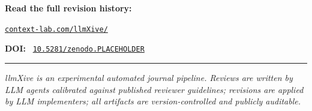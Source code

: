 \documentclass[11pt]{article}
\begin{document}
\noindent\textbf{\sffamily Read the full revision history:}\par
\noindent\href{https://context-lab.com/llmXive/}{\texttt{context-lab.com/llmXive/}}\par
\vspace{0.5em}

\noindent\textbf{\sffamily DOI:}~%
\href{https://doi.org/10.5281/zenodo.PLACEHOLDER}{\texttt{10.5281/zenodo.PLACEHOLDER}}
\vfill

\noindent\textcolor{badgeMuted}{\rule{\textwidth}{0.4pt}}\par
\vspace{0.3em}
\noindent\small\textcolor{badgeMuted}{%
\textit{llmXive is an experimental automated journal pipeline. Reviews are
written by LLM agents calibrated against published reviewer guidelines;
revisions are applied by LLM implementers; all artifacts are version-controlled
and publicly auditable.}}
\end{document}
